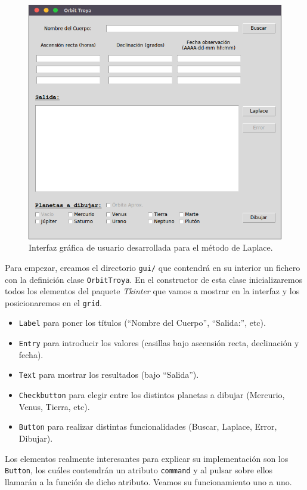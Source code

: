 \documentclass[11pt]{book}
\begin{document}
\begin{figure}[H]
\centering
\includegraphics[scale=0.5]{images/gui.png}
\caption{Interfaz gráfica de usuario desarrollada para el método de Laplace.}
\label{fig:gui}
\end{figure}

Para empezar, creamos el directorio \texttt{gui/} que contendrá en su interior un fichero con la definición clase \texttt{OrbitTroya}. En el constructor de esta clase inicializaremos todos los elementos del paquete \textit{Tkinter} que vamos a mostrar en la interfaz y los posicionaremos en el \texttt{grid}.
\begin{itemize}
\item \texttt{Label} para poner los títulos (``Nombre del Cuerpo'', ``Salida:'', etc).
\item \texttt{Entry} para introducir los valores (casillas bajo ascensión recta, declinación y fecha).
\item \texttt{Text} para mostrar los resultados (bajo ``Salida'').
\item \texttt{Checkbutton} para elegir entre los distintos planetas a dibujar (Mercurio, Venus, Tierra, etc).
\item \texttt{Button} para realizar distintas funcionalidades (Buscar, Laplace, Error, Dibujar).
\end{itemize}

Los elementos realmente interesantes para explicar su implementación son los \texttt{Button}, los cuáles contendrán un atributo \texttt{command} y al pulsar sobre ellos llamarán a la función de dicho atributo. Veamos su funcionamiento uno a uno.\\
\end{document}
